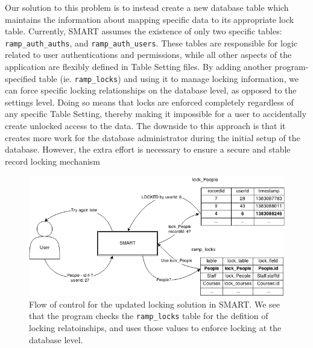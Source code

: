 \documentclass[12pt]{article}
\newcommand{\code}[1]{\texttt{#1}}
\begin{document}
Our solution to this problem is to instead create a new database table which maintains the information about mapping specific data to its appropriate lock table. Currently, SMART assumes the existence of only two specific tables: \code{ramp\_auth\_auths}, and \code{ramp\_auth\_users}. These tables are responsible for logic related to user authentications and permissions, while all other aspects of the application are flexibly defined in Table Setting files. By adding another program-specified table (ie. \code{ramp\_locks}) and using it to manage locking information, we can force specific locking relationships on the database level, as opposed to the settings level. Doing so means that locks are enforced completely regardless of any specific Table Setting, thereby making it impossible for a user to accidentally create unlocked access to the data. The downside to this approach is that it creates more work for the database administrator during the initial setup of the database. However, the extra effort is necessary to ensure a secure and stable record locking mechanism

\begin{center}
\begin{figure}[h]
    \vspace{-10pt}
    \centering
    \centerline{\includegraphics[width=6.5in]{diagrams/SecondLockDesign.png}}
    \begin{spacing}{1.0}\caption{Flow of control for the updated locking solution in SMART. We see that the program checks the \code{ramp\_locks} table for the defition of locking relatoinships, and uses those values to enforce locking at the database level.}\end{spacing}
    \vspace{-10pt}
\end{figure}
\end{center}
\end{document}
